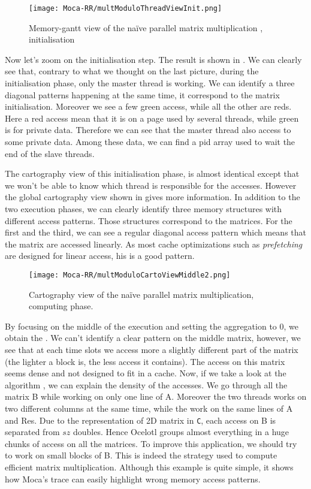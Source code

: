 \begin{figure}[htb]
    \centering
    \texttt{[image: Moca-RR/multModuloThreadViewInit.png]}
    \caption{Memory-gantt view of the naïve parallel matrix multiplication ,
    initialisation}
    \label{fig:ocelotl-th1}
\end{figure}

Now let's zoom on the initialisation step.
The result is shown in .
We can clearly see that, contrary to what we thought on the last picture, during the initialisation phase, only the master thread is working.
We can identify a three diagonal patterns happening at the same time, it correspond to the matrix initialisation.
Moreover we see a few green access, while all the other are reds.
Here a red access mean that it is on a page used by several threads, while green is for private data.
Therefore we can see that the master thread also access to some private data.
Among these data, we can find a pid array used to wait the end of the slave threads.

The cartography view of this initialisation phase, is almost identical except that we won't be able to know which thread is responsible for the accesses.
However the global cartography view shown in  gives more information.
In addition to the two execution phases, we can clearly identify three memory structures with different access patterns.
Those structures correspond to the matrices.
For the first and the third, we can see a regular diagonal access pattern which means that the matrix are accessed linearly.
As most cache optimizations such as \emph{prefetching} are designed for linear access, his is a good pattern.

\begin{figure}[htb]
    \centering
    \texttt{[image: Moca-RR/multModuloCartoViewMiddle2.png]}
    \caption{Cartography view of the naïve parallel matrix multiplication, computing phase.}
    \label{fig:ocelotl-Carto2}
\end{figure}

By focusing on the middle of the execution and setting the aggregation to $0$, we obtain the .
We can't identify a clear pattern on the middle matrix, however, we see that at each time slots we access more a slightly different part of the matrix (the lighter a block is, the less access it contains).
The access on this matrix seems  dense and not designed to fit in a cache.
Now, if we take a look at the algorithm , we can explain the density of the accesses.
We go through all the matrix B while working on only one line of A.
Moreover the two threads works on two different columns at the same time, while the work on the same lines of A and Res.
Due to the representation of 2D matrix in \texttt{C}, each access on B is separated from $sz$ doubles.
Hence \gls{Ocelotl} groups almost everything in a huge chunks of access on all the matrices.
To improve this application, we should try to work on small blocks of B.
This is indeed the strategy used to compute efficient matrix multiplication.
Although this example is quite simple, it shows how \gls{Moca}'s trace can easily highlight wrong memory access patterns.

